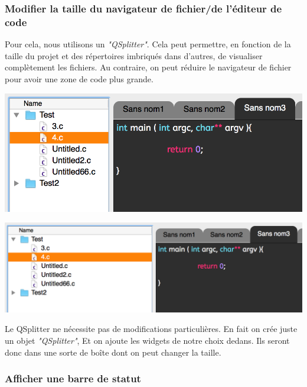\documentclass[a4paper,12pt]{article}
\begin{document}
			\subsubsection*{Modifier la taille du navigateur de fichier/de l'éditeur de code}
				Pour cela, nous utilisons un \textit{"QSplitter"}. Cela peut permettre, en fonction de la taille du projet et des répertoires imbriqués dans d'autres, de visualiser complètement les fichiers. Au contraire, on peut réduire le navigateur de fichier pour avoir une zone de code plus grande.\\
			\begin{center}
				\includegraphics[scale=0.6]{images/QSplitter_1}
				\vspace{0.6cm}
			\end{center}

			\begin{center}
				\includegraphics[scale=0.6]{images/QSplitter_2}
				\vspace{0.6cm}
			\end{center}
			Le QSplitter ne nécessite pas de modifications particulières. En fait on crée juste un objet \textit{"QSplitter"}, Et on ajoute les widgets de notre choix dedans. Ils seront donc dans une sorte de boîte dont on peut changer la taille.\\
			
			\subsubsection*{Afficher une barre de statut}
			
\end{document}
